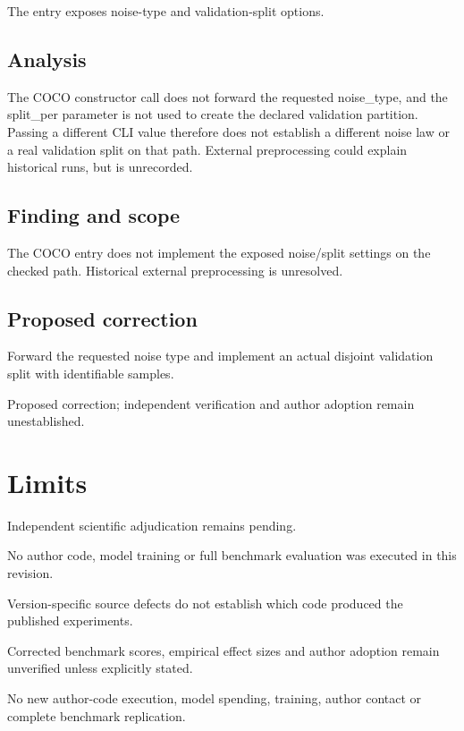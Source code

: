 \documentclass[11pt]{article}
\begin{document}
The entry exposes noise-type and validation-split options.

\subsection*{Analysis}

The COCO constructor call does not forward the requested noise\_type, and the split\_per parameter is not used to create the declared validation partition. Passing a different CLI value therefore does not establish a different noise law or a real validation split on that path. External preprocessing could explain historical runs, but is unrecorded.

\subsection*{Finding and scope}

The COCO entry does not implement the exposed noise/split settings on the checked path. Historical external preprocessing is unresolved.

\subsection*{Proposed correction}

Forward the requested noise type and implement an actual disjoint validation split with identifiable samples.

Proposed correction; independent verification and author adoption remain unestablished.

\section*{Limits}

Independent scientific adjudication remains pending.\par

No author code, model training or full benchmark evaluation was executed in this revision.\par

Version-specific source defects do not establish which code produced the published experiments.\par

Corrected benchmark scores, empirical effect sizes and author adoption remain unverified unless explicitly stated.\par

No new author-code execution, model spending, training, author contact or complete benchmark replication.\par
\end{document}

